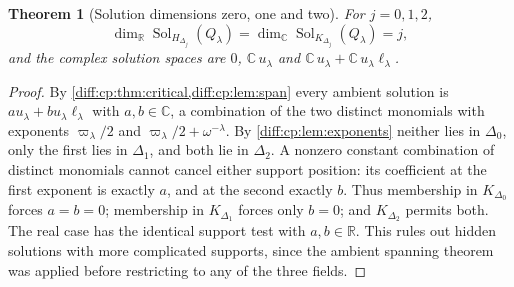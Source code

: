 \documentclass[11pt,letterpaper]{article}
\numberwithin{equation}{section}
\newtheorem{theorem}{Theorem}[section]
\theoremstyle{definition}
\theoremstyle{remark}
\newcommand{\R}{\mathbb R}
\newcommand{\C}{\mathbb C}
\newcommand{\Sol}{\operatorname{Sol}}
\begin{document}
\begin{theorem}[Solution dimensions zero, one and two]
\label{diff:cp:thm:fieldjump}
For $j=0,1,2$,
\begin{equation}\label{diff:cp:eq:jump}
 \dim_{\R}\Sol_{H_{\Delta_{j}}}(Q_{\lambda})
 =\dim_{\C}\Sol_{K_{\Delta_{j}}}(Q_{\lambda})=j,
\end{equation}
and the complex solution spaces are $0$, $\C\,u_{\lambda}$ and
$\C\,u_{\lambda}+\C\,u_{\lambda}\ell_{\lambda}$.
\end{theorem}
\begin{proof}
By \cref{diff:cp:thm:critical,diff:cp:lem:span} every ambient solution is
$au_{\lambda}+bu_{\lambda}\ell_{\lambda}$ with $a,b\in\C$, a combination of the
two distinct monomials with exponents $\varpi_{\lambda}/2$ and
$\varpi_{\lambda}/2+\omega^{-\lambda}$. By \cref{diff:cp:lem:exponents} neither
lies in $\Delta_{0}$, only the first lies in $\Delta_{1}$, and both lie in
$\Delta_{2}$. A nonzero constant combination of distinct monomials cannot cancel
either support position: its coefficient at the first exponent
is exactly $a$, and at the second exactly $b$.
Thus membership in $K_{\Delta_0}$ forces $a=b=0$; membership in
$K_{\Delta_1}$ forces only $b=0$; and $K_{\Delta_2}$ permits both.
The real case has the identical support test with $a,b\in\R$.
This rules out hidden solutions with more complicated supports,
since the ambient spanning theorem was applied before restricting
to any of the three fields.
\end{proof}
\end{document}
